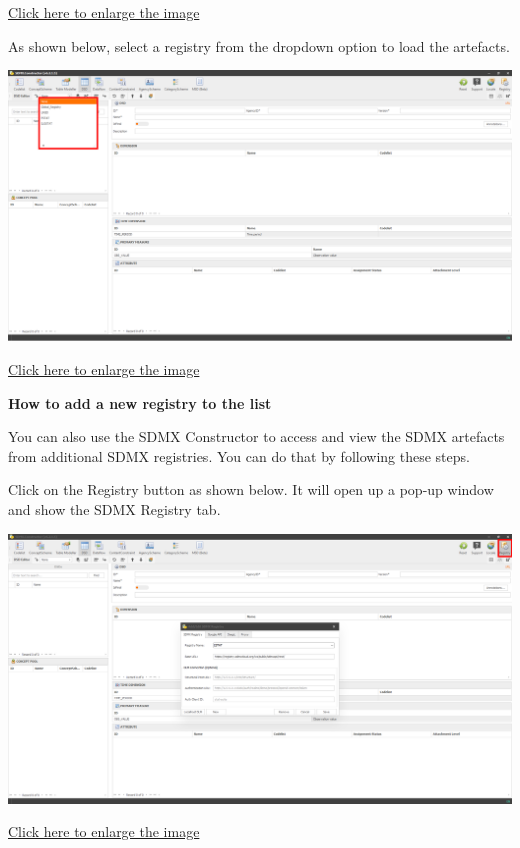 \documentclass[
]{book}
\begin{document}
\href{images/image044.png}{Click here to enlarge the image}

As shown below, select a registry from the dropdown option to load the artefacts.

\begin{center}\includegraphics[width=1\linewidth]{./images/image046} \end{center}

\href{images/image046.png}{Click here to enlarge the image}

\textbf{How to add a new registry to the list}

You can also use the SDMX Constructor to access and view the SDMX artefacts from additional SDMX registries. You can do that by following these steps.

Click on the Registry button as shown below. It will open up a pop-up window and show the SDMX Registry tab.

\begin{center}\includegraphics[width=1\linewidth]{./images/image235} \end{center}

\href{images/image235.png}{Click here to enlarge the image}
\end{document}
